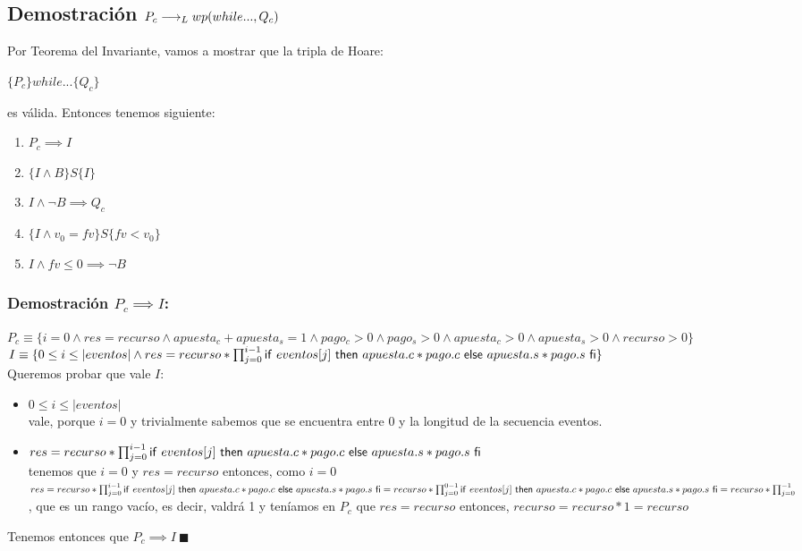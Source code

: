 \documentclass[10pt,a4paper]{article}
\begin{document}
\subsection*{Demostración $P_c \longrightarrow _L wp(while..., Q_c)$}
\begin{minipage}[t]{18cm}
Por Teorema del Invariante, vamos a mostrar que la tripla de Hoare:
\begin{center}
	$\{P_c\} while...\{Q_c\}$
\end{center}
es válida. Entonces tenemos siguiente:
\begin{enumerate}
	\item $P_c \implies I$
	\item $\{I\land B\}S\{I\}$
	\item $I \land \neg B \implies Q_c$
	\item $\{I\land v_{0}=fv\}S\{fv<v_{0}\}$
	\item $I\land fv \leq 0 \implies \neg B$
\end{enumerate}
\subsubsection*{Demostración $P_c \implies I$:}
$P_c \equiv \{i = 0 \land res = recurso \land apuesta_c + apuesta_s = 1 \land pago_c > 0 \land pago_s > 0 \land apuesta_c > 0 \land apuesta_s > 0 \land recurso > 0\}$ \\
$I \equiv \{ 0 \leq i \leq |eventos| \land res = recurso * \prod_{j = 0}^{i - 1} \mathsf{if}\ eventos[j]\ \mathsf{then}\ apuesta.c *pago.c\ \mathsf{else}\ apuesta.s * pago.s\ \mathsf{fi}\}$ \\
Queremos probar que vale $I$:
\begin{itemize}
	\item $0 \leq i \leq |eventos|$ \\ vale, porque $i = 0$ y trivialmente sabemos que se encuentra entre 0 y la longitud de la secuencia eventos.
	\item $res = recurso * \prod_{j = 0}^{i - 1} \mathsf{if}\ eventos[j]\ \mathsf{then}\ apuesta.c *pago.c\ \mathsf{else}\ apuesta.s * pago.s\ \mathsf{fi}$ \\ tenemos que $i = 0$ y $res = recurso$ entonces, como $i = 0$ \\ 
	$res = recurso * \prod_{j = 0}^{i - 1} \mathsf{if}\ eventos[j]\ \mathsf{then}\ apuesta.c *pago.c\ \mathsf{else}\ apuesta.s * pago.s\ \mathsf{fi} = recurso * \prod_{j = 0}^{0 - 1} \mathsf{if}\ eventos[j]\ \mathsf{then}\ apuesta.c *pago.c\ \mathsf{else}\ apuesta.s * pago.s\ \mathsf{fi} = recurso * \prod_{j = 0}^{-1}$, que es un rango vacío, es decir, valdrá 1 y teníamos en $P_c$ que $res = recurso$ entonces, $recurso = recurso * 1 = recurso$
\end{itemize}
Tenemos entonces que $P_c \implies I\ \blacksquare$

\end{minipage}
\end{document}
